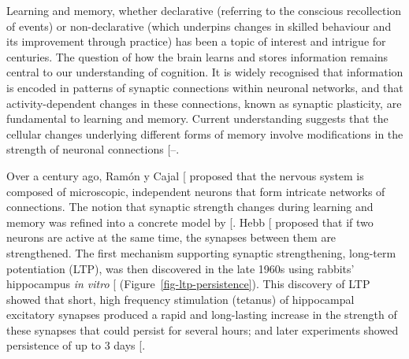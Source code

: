 \documentclass[
  11pt,
  letterpaper,
]{scrreprt}
\begin{document}
Learning and memory, whether declarative (referring to the conscious
recollection of events) or non-declarative (which underpins changes in
skilled behaviour and its improvement through practice) has been a topic
of interest and intrigue for centuries. The question of how the brain
learns and stores information remains central to our understanding of
cognition. It is widely recognised that information is encoded in
patterns of synaptic connections within neuronal networks, and that
activity-dependent changes in these connections, known as synaptic
plasticity, are fundamental to learning and memory. Current
understanding suggests that the cellular changes underlying different
forms of memory involve modifications in the strength of neuronal
connections
{[}--\citeproc{ref-abraham2019Plasticity}{19}{]}.

Over a century ago, Ramón y Cajal
{[}\citeproc{ref-ramonycajal1909HistologieSystemeNerveux}{20}{]}
proposed that the nervous system is composed of microscopic, independent
neurons that form intricate networks of connections. The notion that
synaptic strength changes during learning and memory was refined into a
concrete model by
{[}\citeproc{ref-hebb1949OrganizationBehaviorNeuropsychological}{21}{]}.
Hebb
{[}\citeproc{ref-hebb1949OrganizationBehaviorNeuropsychological}{21}{]}
proposed that if two neurons are active at the same time, the synapses
between them are strengthened. The first mechanism supporting synaptic
strengthening, long-term potentiation (LTP), was then discovered in the
late 1960s using rabbits' hippocampus \emph{in vitro}
{[}\citeproc{ref-lomo1971PatternsActivationMonosynaptic}{22}{]}
(Figure~\ref{fig-ltp-persistence}). This discovery of LTP showed that
short, high frequency stimulation (tetanus) of hippocampal excitatory
synapses produced a rapid and long-lasting increase in the strength of
these synapses that could persist for several hours; and later
experiments showed persistence of up to 3 days
{[}\citeproc{ref-bliss1973Longlasting}{23}{]}.
\end{document}
